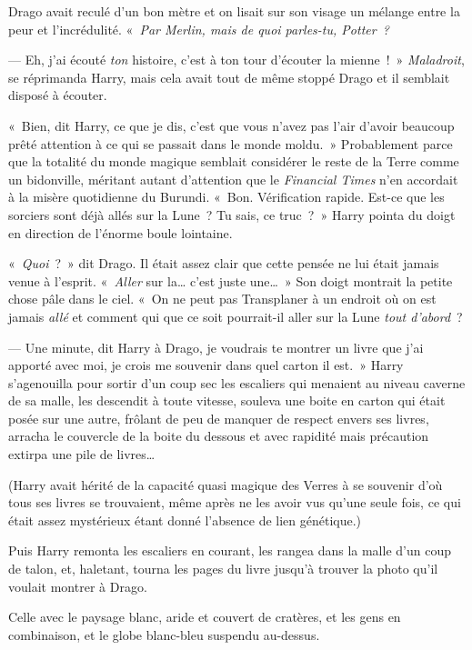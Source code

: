 Drago avait reculé d'un bon mètre et on lisait sur son visage un mélange entre la peur et l'incrédulité.  «~\emph{Par Merlin, mais de quoi parles-tu, Potter~?}

--- Eh, j'ai écouté \emph{ton} histoire, c'est à ton tour d'écouter la mienne~!~» \emph{Maladroit}, se réprimanda Harry, mais cela avait tout de même stoppé Drago et il semblait disposé à écouter.

«~Bien, dit Harry, ce que je dis, c'est que vous n'avez pas l'air d'avoir beaucoup prêté attention à ce qui se passait dans le monde moldu.~»
Probablement parce que la totalité du monde magique semblait considérer le reste de la Terre comme un bidonville, méritant autant d'attention que le \emph{Financial Times} n'en accordait à la misère quotidienne du Burundi.
«~Bon. Vérification rapide. Est-ce que les sorciers sont déjà allés sur la Lune~? Tu sais, ce truc~?~»
Harry pointa du doigt en direction de l'énorme boule lointaine.

«~\emph{Quoi}~?~» dit Drago. Il était assez clair que cette pensée ne lui était jamais venue à l'esprit.
«~\emph{Aller} sur la… c'est juste une…~» Son doigt montrait la petite chose pâle dans le ciel.
«~On ne peut pas Transplaner à un endroit où on est jamais \emph{allé} et comment qui que ce soit pourrait-il aller sur la Lune \emph{tout d'abord}~?

--- Une minute, dit Harry à Drago, je voudrais te montrer un livre que j'ai apporté avec moi, je crois me souvenir dans quel carton il est.~»
Harry s'agenouilla pour sortir d'un coup sec les escaliers qui menaient au niveau caverne de sa malle, les descendit à toute vitesse, souleva une boite en carton qui était posée sur une autre, frôlant de peu de manquer de respect envers ses livres, arracha le couvercle de la boite du dessous et avec rapidité mais précaution extirpa une pile de livres…

(Harry avait hérité de la capacité quasi magique des Verres à se souvenir d'où tous ses livres se trouvaient, même après ne les avoir vus qu'une seule fois, ce qui était assez mystérieux étant donné l'absence de lien génétique.)

Puis Harry remonta les escaliers en courant, les rangea dans la malle d'un coup de talon, et, haletant, tourna les pages du livre jusqu'à trouver la photo qu'il voulait montrer à Drago.

Celle avec le paysage blanc, aride et couvert de cratères, et les gens en combinaison, et le globe blanc-bleu suspendu au-dessus.

